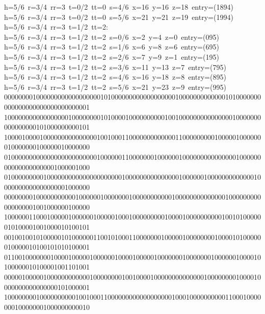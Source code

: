 \begin{tabbing}
h=5/6\ r=3/4\ rr=3\ t=0/2\ tt=0\ s=4/6\ x=16\ y=16\ z=18\ entry=(1894)\\[0pt]
h=5/6\ r=3/4\ rr=3\ t=0/2\ tt=0\ s=5/6\ x=21\ y=21\ z=19\ entry=(1994)\\[0pt]
h=5/6\ r=3/4\ rr=3\ t=1/2\ tt=2:\\[0pt]
h=5/6\ r=3/4\ rr=3\ t=1/2\ tt=2\ s=0/6\ x=2\ y=4\ z=0\ entry=(095)\\[0pt]
h=5/6\ r=3/4\ rr=3\ t=1/2\ tt=2\ s=1/6\ x=6\ y=8\ z=6\ entry=(695)\\[0pt]
h=5/6\ r=3/4\ rr=3\ t=1/2\ tt=2\ s=2/6\ x=7\ y=9\ z=1\ entry=(195)\\[0pt]
h=5/6\ r=3/4\ rr=3\ t=1/2\ tt=2\ s=3/6\ x=11\ y=13\ z=7\ entry=(795)\\[0pt]
h=5/6\ r=3/4\ rr=3\ t=1/2\ tt=2\ s=4/6\ x=16\ y=18\ z=8\ entry=(895)\\[0pt]
h=5/6\ r=3/4\ rr=3\ t=1/2\ tt=2\ s=5/6\ x=21\ y=23\ z=9\ entry=(995)\\[0pt]
000000001000000000000000000101000000000000000000100000000000001010000000000000000000000000000001\\[0pt]
100000000000000000100000000101000010000000000100100000000000000010000000000000000101000000000101\\[0pt]
100001000010000000000000001001000110000000000000110000000001000001000000010000000100000010000000\\[0pt]
010000000000000000000000001000000110000000100000010000000000000001000000000000000000001000001000\\[0pt]
010000000001000000000000000000000100000000000000010000001000000000000010000000000000000001000000\\[0pt]
000000001000000000001000000100000001000000000001000000000000001000000000000000001001000000100000\\[0pt]
100000011000100000100000010000010001000000000100001000000000010010100000010100001001000010100101\\[0pt]
001001001010000010100000011001010001100000001000001000000001000010100000010000010100101010100001\\[0pt]
011001000000010000100000100000010000100000100000001000000010000001000010100000010100001001101001\\[0pt]
000001000001000000000000100000000100100001000000000000001000000001000010000000000000000101000001\\[0pt]
100000000100000000001001000110000000000000000001000100000000001100010000000100000001000000000010\\[0pt]

\end{tabbing}
